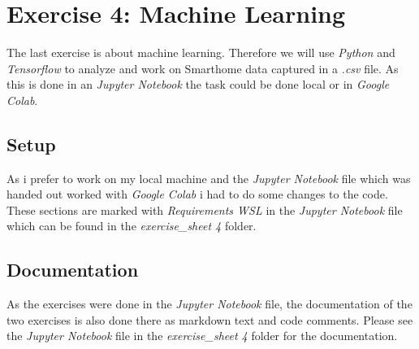 \section{Exercise 4: Machine Learning}
The last exercise is about machine learning. Therefore we will use \textit{Python} and \textit{Tensorflow} 
to analyze and work on Smarthome data captured in a \textit{.csv} file. 
As this is done in an \textit{Jupyter Notebook} the task could be done local or in \textit{Google Colab}.

\subsection{Setup}
As i prefer to work on my local machine and the \textit{Jupyter Notebook} file which was handed out 
worked with \textit{Google Colab} i had to do some changes to the code.
These sections are marked with \textit{Requirements WSL} in the \textit{Jupyter Notebook} file 
which can be found in the \textit{exercise\_sheet 4} folder.

\subsection{Documentation}
As the exercises were done in the \textit{Jupyter Notebook} file, the documentation of the two exercises 
is also done there as markdown text and code comments.
Please see the \textit{Jupyter Notebook} file in the \textit{exercise\_sheet 4} folder for the documentation.